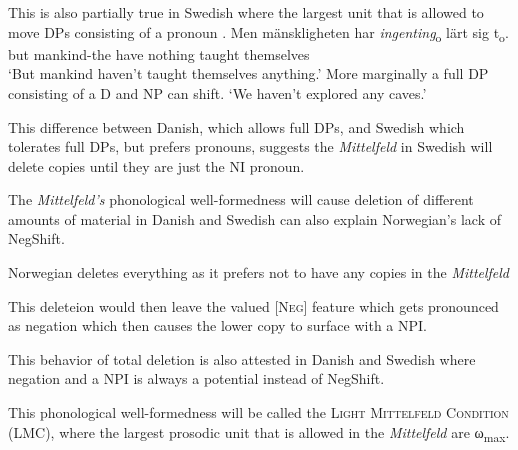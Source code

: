 \documentclass[12pt, letterpaper]{article}
\newcommand{\sub}[1]{\textsubscript{#1}}
\begin{document}
	\ex This is also partially true in Swedish where the largest unit that is allowed to move DPs consisting of a pronoun \citep{penkaNegativeIndefinites2011}.
		\ea 
		\gll Men mänskligheten har \textit{ingenting}\textsubscript{o} lärt sig t\textsubscript{o}.\\
		but mankind-the have nothing taught themselves\\
		\glt `But mankind haven't taught themselves anything.'
		\z 
	\ex More marginally a full DP consisting of a D and NP can shift. 
		\glt `We haven't explored any caves.'
		\z  
	\z 	

\ex This difference between Danish, which allows full DPs, and Swedish which tolerates full DPs, but prefers pronouns, suggests the \emph{Mittelfeld} in Swedish will delete copies until they are just the NI pronoun. 

\ex The \emph{Mittelfeld's} phonological well-formedness will cause deletion of different amounts of material in Danish and Swedish can also explain Norwegian's lack of NegShift. 

	\ea Norwegian deletes everything as it prefers not to have any copies in the \emph{Mittelfeld}

	\ex This deleteion would then leave the valued [\textsc{Neg}] feature which gets pronounced as negation which then causes the lower copy to surface with a NPI.  

	\ex This behavior of total deletion is also attested in Danish and Swedish where negation and a NPI is always a potential instead of NegShift.
	\z 

\ex This phonological well-formedness will be called the \textsc{Light Mittelfeld Condition} (LMC), where the largest prosodic unit that is allowed in the \emph{Mittelfeld} are ω\sub{max}. 

\z 


\end{document}
